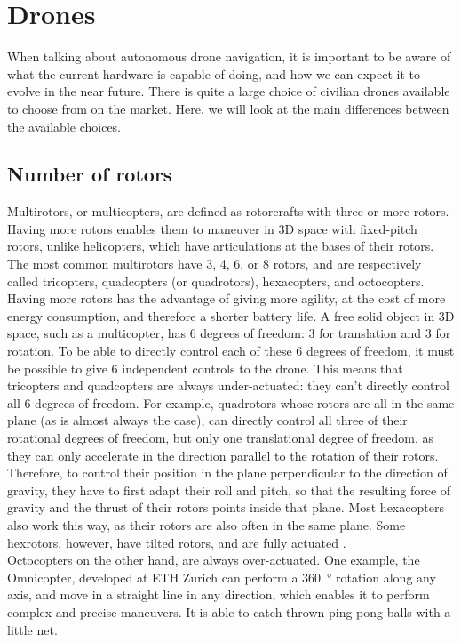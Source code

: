 \section{Drones}
When talking about autonomous drone navigation, it is important to be aware of what the current hardware is capable of doing, and how we can expect it to evolve in the near future. There is quite a large choice of civilian drones available to choose from on the market. Here, we will look at the main differences between the available choices.

\subsection{Number of rotors}
Multirotors, or multicopters, are defined as rotorcrafts with three or more rotors. Having more rotors enables them to maneuver in 3D space with fixed-pitch rotors, unlike helicopters, which have articulations at the bases of their rotors. The most common multirotors have 3, 4, 6, or 8 rotors, and are respectively called tricopters, quadcopters (or quadrotors), hexacopters, and octocopters. Having more rotors has the advantage of giving more agility, at the cost of more energy consumption, and therefore a shorter battery life. A free solid object in 3D space, such as a multicopter, has 6 degrees of freedom: 3 for translation and 3 for rotation. To be able to directly control each of these 6 degrees of freedom, it must be possible to give 6 independent controls to the drone. This means that tricopters and quadcopters are always under-actuated: they can't directly control all 6 degrees of freedom.
For example, quadrotors whose rotors are all in the same plane (as is almost always the case), can directly control all three of their rotational degrees of freedom, but only one translational degree of freedom, as they can only accelerate in the direction parallel to the rotation of their rotors. Therefore, to control their position in the plane perpendicular to the direction of gravity, they have to first adapt their roll and pitch, so that the resulting force of gravity and the thrust of their rotors points inside that plane. Most hexacopters also work this way, as their rotors are also often in the same plane. Some hexrotors, however, have tilted rotors, and are fully actuated  \cite{dexteroushexrotor}. \\
Octocopters on the other hand, are always over-actuated. One example, the Omnicopter, developed at ETH Zurich \cite{omnidirectionalav} can perform a \SI{360}{\degree} rotation along any axis, and move in a straight line in any direction, which enables it to perform complex and precise maneuvers. It is able to catch thrown ping-pong balls with a little net.

